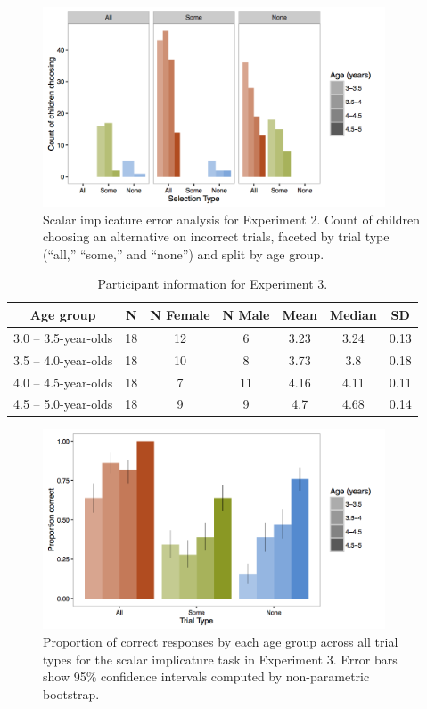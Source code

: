 \documentclass[man]{apa2}
\begin{document}
\begin{figure}
 \begin{center}
  \includegraphics[width=4in]{figures/exp2_wrong.png}
  \caption{\label{fig:exp2_wrong} Scalar implicature error analysis for Experiment 2. Count of children choosing an alternative on incorrect trials, faceted by trial type (``all,'' ``some,'' and ``none'') and split by age group.}
 \end{center}
\end{figure}

\begin{table}
\centering
\begin{tabular}{ccccccc}
\hline
{\bf Age group} & {\bf N} & {\bf N Female} & {\bf N Male} & {\bf Mean} &  {\bf Median} & {\bf SD} \\
\hline
3.0 -- 3.5-year-olds & 18 & 12 & 6 & 3.23 & 3.24 & 0.13\\
3.5 -- 4.0-year-olds & 18 & 10 & 8 & 3.73 & 3.8 & 0.18\\
4.0 -- 4.5-year-olds & 18 & 7 & 11 & 4.16 & 4.11 & 0.11\\
4.5 -- 5.0-year-olds & 18 & 9 & 9 & 4.7 & 4.68 & 0.14\\
\hline
\end{tabular}
\caption{\label{tab:exp_3_demo} Participant information for Experiment 3.}
\end{table}

\begin{figure}
 \begin{center}
  \includegraphics[width=4in]{figures/exp3_SIperformance.png}
  \caption{\label{fig:exp3_perf} Proportion of correct responses by each age group across all trial types for the scalar implicature task in Experiment 3. Error bars show 95\% confidence intervals computed by non-parametric bootstrap.}
 \end{center}
\end{figure}
\end{document}
